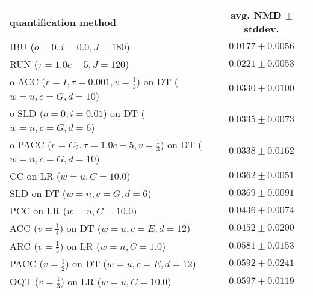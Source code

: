 \begin{tabular}{lc}
  \toprule
  quantification method & avg. NMD $\pm$ stddev. \\
  \midrule
  IBU ($o=0, i=0.0, J=180$) & $\mathbf{0.0177 \pm 0.0056}$ \\
  RUN ($\tau=1.0e-5, J=120$) & $0.0221 \pm 0.0053$ \\
  o-ACC ($r=I, \tau=0.001, v=\frac{1}{3}$) on DT ($w=u, c=G, d=10$) & $0.0330 \pm 0.0100$ \\
  o-SLD ($o=0, i=0.01$) on DT ($w=n, c=G, d=6$) & $0.0335 \pm 0.0073$ \\
  o-PACC ($r=C_2, \tau=1.0e-5, v=\frac{1}{3}$) on DT ($w=n, c=G, d=10$) & $0.0338 \pm 0.0162$ \\
  CC on LR ($w=u, C=10.0$) & $0.0362 \pm 0.0051$ \\
  SLD on DT ($w=n, c=G, d=6$) & $0.0369 \pm 0.0091$ \\
  PCC on LR ($w=u, C=10.0$) & $0.0436 \pm 0.0074$ \\
  ACC ($v=\frac{1}{4}$) on DT ($w=u, c=E, d=12$) & $0.0452 \pm 0.0200$ \\
  ARC ($v=\frac{1}{3}$) on LR ($w=n, C=1.0$) & $0.0581 \pm 0.0153$ \\
  PACC ($v=\frac{1}{2}$) on DT ($w=u, c=E, d=12$) & $0.0592 \pm 0.0241$ \\
  OQT ($v=\frac{1}{3}$) on LR ($w=u, C=10.0$) & $0.0597 \pm 0.0119$ \\
  \bottomrule
\end{tabular}
